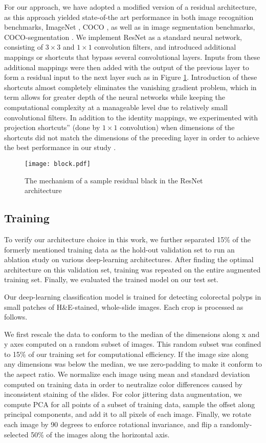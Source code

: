 \documentclass[review]{elsarticle}
\begin{document}
For our approach, we have adopted a modified version of a residual architecture, as this approach yielded state-of-the art performance in both image recognition benchmarks, ImageNet \citep{russakovsky2015imagenet}, COCO \citep{tsung2014coco}, as well as in image segmentation benchmarks, COCO-segmentation \citep{tsung2014coco}. We implement ResNet as a standard neural network, consisting of $3\times 3$ and $1 \times 1$ convolution filters, and introduced additional mappings or shortcuts that bypass several convolutional layers. Inputs from these additional mappings were then added with the output of the previous layer to form a residual input to the next layer such as in Figure \ref{fig:block}. Introduction of these shortcuts almost completely eliminates the vanishing gradient problem, which in term allows for greater depth of the neural networks while keeping the computational complexity at a manageable level due to relatively small convolutional filters. In addition to the identity mappings, we experimented with projection shortcuts” (done by $1\times 1$ convolution) when dimensions of the shortcuts did not match the dimensions of the preceding layer in order to achieve the best performance in our study \citep{he2015deep}.

\begin{figure}[h!]
\centering
\texttt{[image: block.pdf]}
\caption{The mechanism of a sample residual black in the ResNet architecture \citep{he2015deep}}
\label{fig:block}
\end{figure}\subsection{Training}\label{training}
To verify our architecture choice in this work, we further separated 15\% of the formerly mentioned training data as the hold-out validation set to run an ablation study on various deep-learning architectures. After finding the optimal architecture on this validation set, training was repeated on the entire augmented training set. Finally, we evaluated the trained model on our test set.

Our deep-learning classification model is trained for detecting colorectal polyps in small patches of H\&E-stained, whole-slide images. Each crop is processed as follows.

We first rescale the data to conform to the median of the dimensions along x and y axes computed on a random subset of images. This random subset was confined to 15\% of our training set for computational efficiency. If the image size along any dimensions was below the median, we use zero-padding to make it conform to the aspect ratio. We normalize each image using mean and standard deviation computed on training data in order to neutralize color differences caused by inconsistent staining of the slides. For color jittering data augmentation, we compute PCA for all points of a subset of training data, sample the offset along principal components, and add it to all pixels of each image. Finally, we rotate each image by 90 degrees to enforce rotational invariance, and flip a randomly-selected 50\% of the images along the horizontal axis.
\end{document}
